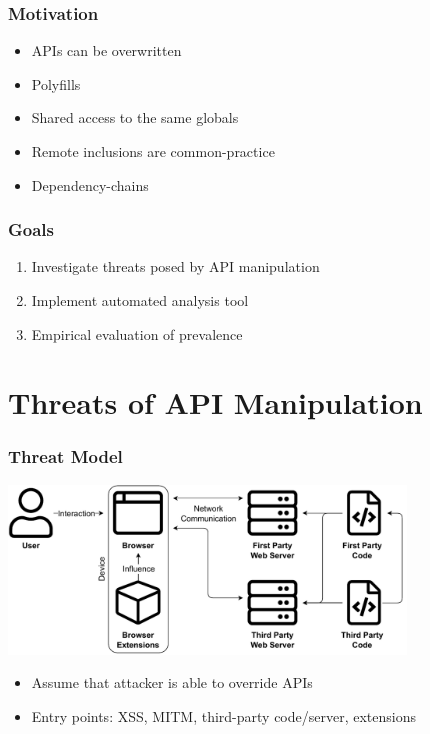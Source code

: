 \documentclass[t,aspectratio=169]{beamer}
\begin{document}
\begin{frame}
	\frametitle{Motivation}
	\begin{itemize}
		\item APIs can be overwritten
		\item Polyfills
		\item Shared access to the same globals
		\item Remote inclusions are common-practice
		\item Dependency-chains
	\end{itemize}
\end{frame}

\begin{frame}
	\frametitle{Goals}
	\begin{enumerate}
		\item Investigate threats posed by API manipulation
		\item Implement automated analysis tool
		\item Empirical evaluation of prevalence
	\end{enumerate}
\end{frame}



\section{Threats of API Manipulation}

\begin{frame}
	\frametitle{Threat Model}
	\begin{center}
		\includegraphics[height=4.5cm]{img/threat-model.pdf}
	\end{center}
	\begin{itemize}
		\item Assume that attacker is able to override APIs
		\item Entry points: XSS, MITM, third-party code/server, extensions
	\end{itemize}
\end{frame}
\end{document}
